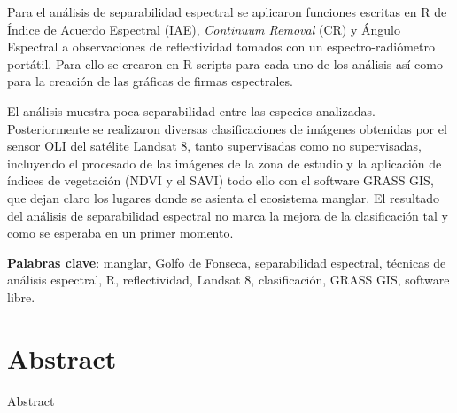 Para el análisis de separabilidad espectral se aplicaron funciones escritas en R de Índice de Acuerdo Espectral (IAE), \textit{Continuum Removal} (CR) y Ángulo Espectral a observaciones de reflectividad tomados con un espectro-radiómetro portátil. Para ello se crearon en R scripts para cada uno de los análisis así como para la creación de las gráficas de firmas espectrales.

El análisis muestra poca separabilidad entre las especies analizadas. Posteriormente se realizaron diversas clasificaciones de imágenes obtenidas por el sensor OLI del satélite Landsat 8, tanto supervisadas como no supervisadas, incluyendo el procesado de las imágenes de la zona de estudio y la aplicación de índices de vegetación (NDVI y el SAVI) todo ello con el software GRASS GIS, que dejan claro los lugares donde se asienta el ecosistema manglar. El resultado del análisis de separabilidad espectral no marca la mejora de la clasificación tal y como se esperaba en un primer momento.

\noindent\textbf{Palabras clave}: manglar, Golfo de Fonseca, separabilidad espectral, técnicas de análisis espectral, R, reflectividad, Landsat 8, clasificación, GRASS GIS, software libre.

\section*{Abstract}
Abstract